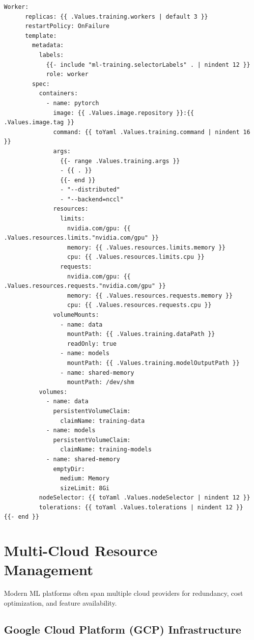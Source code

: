 \begin{lstlisting}[style=yaml, caption=PyTorch Distributed Training Job]
    Worker:
      replicas: {{ .Values.training.workers | default 3 }}
      restartPolicy: OnFailure
      template:
        metadata:
          labels:
            {{- include "ml-training.selectorLabels" . | nindent 12 }}
            role: worker
        spec:
          containers:
            - name: pytorch
              image: {{ .Values.image.repository }}:{{ .Values.image.tag }}
              command: {{ toYaml .Values.training.command | nindent 16 }}
              args:
                {{- range .Values.training.args }}
                - {{ . }}
                {{- end }}
                - "--distributed"
                - "--backend=nccl"
              resources:
                limits:
                  nvidia.com/gpu: {{ .Values.resources.limits."nvidia.com/gpu" }}
                  memory: {{ .Values.resources.limits.memory }}
                  cpu: {{ .Values.resources.limits.cpu }}
                requests:
                  nvidia.com/gpu: {{ .Values.resources.requests."nvidia.com/gpu" }}
                  memory: {{ .Values.resources.requests.memory }}
                  cpu: {{ .Values.resources.requests.cpu }}
              volumeMounts:
                - name: data
                  mountPath: {{ .Values.training.dataPath }}
                  readOnly: true
                - name: models
                  mountPath: {{ .Values.training.modelOutputPath }}
                - name: shared-memory
                  mountPath: /dev/shm
          volumes:
            - name: data
              persistentVolumeClaim:
                claimName: training-data
            - name: models
              persistentVolumeClaim:
                claimName: training-models
            - name: shared-memory
              emptyDir:
                medium: Memory
                sizeLimit: 8Gi
          nodeSelector: {{ toYaml .Values.nodeSelector | nindent 12 }}
          tolerations: {{ toYaml .Values.tolerations | nindent 12 }}
{{- end }}
\end{lstlisting}

\section{Multi-Cloud Resource Management}

Modern ML platforms often span multiple cloud providers for redundancy, cost optimization, and feature availability.

\subsection{Google Cloud Platform (GCP) Infrastructure}

